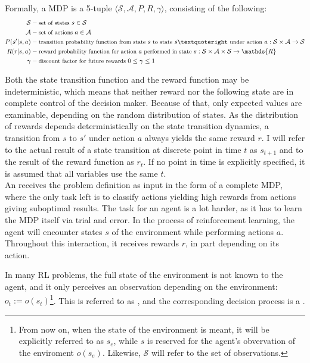 Formally, a MDP is a 5-tuple $\langle \mathcal{S}, \mathcal{A}, P, R, \gamma \rangle$, consisting of the following:\\
\begin{align*}
\mathcal{S} &- \text{\small set of states } s\in \mathcal{S}\\
\mathcal{A} &- \text{\small set of actions } a \in \mathcal{A}\\
P(s'|s, a) &- \text{\small transition probability function from state } s \text{\small ~to state } s’ \text{\small ~under action } a: \mathcal{S} \times \mathcal{A} \rightarrow \mathcal{S} \\
R(r|s, a) &- \text{\small reward probability function for action } a \text{\small ~performed in state } s: \mathcal{S} \times \mathcal{A} \times \mathcal{S} \rightarrow \mathds{R} \\
\gamma &- \text{\small discount factor for future rewards } 0 \leq \gamma \leq 1
\end{align*}

Both the state transition function and the reward function may be indeterministic, which means that neither reward nor the following state are in complete control of the decision maker. Because of that, only expected values are examinable, depending on the random distribution of states. As the distribution of rewards depends deterministically on the state transition dynamics, a transition from $s$ to $s'$ under action $a$ always yields the same reward $r$. I will refer to the actual result of a state transition at discrete point in time $t$ as $s_{t+1}$ and to the result of the reward function as $r_t$. If no point in time is explicitly specified, it is assumed that all variables use the same $t$.\\

\noindent An  receives the problem definition as input in the form of a complete MDP, where the only task left is to classify actions yielding high rewards from actions giving suboptimal results. The task for an  agent is a lot harder, as it has to learn the MDP itself via trial and error. In the process of reinforcement learning, the agent will encounter states $s$ of the environment while performing actions $a$. Throughout this interaction, it receives rewards $r$, in part depending on its action.

In many RL problems, the full state of the environment is not known to the agent, and it only perceives an observation depending on the environment: $o_t := o(s_t)$\footnote{From now on, when the state of the environment is meant, it will be explicitly referred to as $s_e$, while $s$ is reserved for the agent's obvervation of the enviroment $o(s_e)$. Likewise, $\mathcal{S}$ will refer to the set of observations.}. This is referred to as , and the corresponding decision process is a . 

